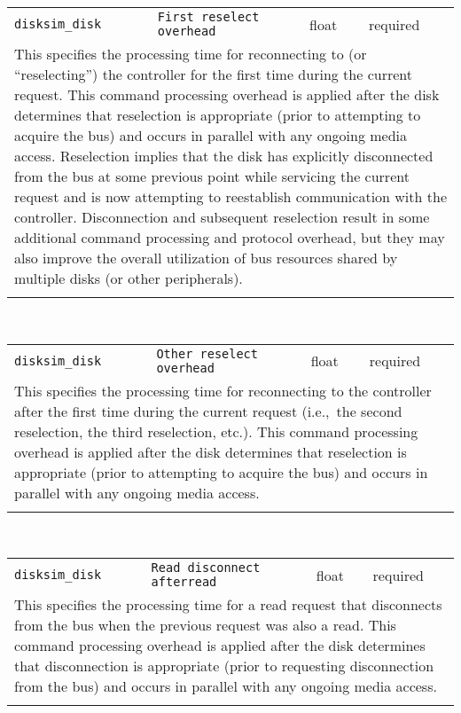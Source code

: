 \noindent 
\begin{tabular}{|p{\lpmodwidth}|p{\lpnamewidth}|p{0.5in}|p{0.5in}|}
\cline{1-4}
\texttt{disksim\_disk} & \texttt{First reselect overhead} & float & required \\ 
\cline{1-4}
\multicolumn{4}{|p{6in}|}{
This specifies the processing time for reconnecting to (or
``reselecting'') the controller for the first time during the current
request. This command processing overhead is applied after the disk
determines that reselection is appropriate (prior to attempting to
acquire the bus) and occurs in parallel with any ongoing media access.
Reselection implies that the disk has explicitly disconnected from the
bus at some previous point while servicing the current request and is
now attempting to reestablish communication with the controller.
Disconnection and subsequent reselection result in some additional
command processing and protocol overhead, but they may also improve
the overall utilization of bus resources shared by multiple disks (or
other peripherals).
}\\ 
\cline{1-4}
\multicolumn{4}{p{5in}}{}\\
\end{tabular}\\ 
\noindent 
\begin{tabular}{|p{\lpmodwidth}|p{\lpnamewidth}|p{0.5in}|p{0.5in}|}
\cline{1-4}
\texttt{disksim\_disk} & \texttt{Other reselect overhead} & float & required \\ 
\cline{1-4}
\multicolumn{4}{|p{6in}|}{
This specifies the processing time for reconnecting to the controller
after the first time during the current request (i.e.,~the second
reselection, the third reselection, etc.). This command processing
overhead is applied after the disk determines that reselection is
appropriate (prior to attempting to acquire the bus) and occurs in
parallel with any ongoing media access.
}\\ 
\cline{1-4}
\multicolumn{4}{p{5in}}{}\\
\end{tabular}\\ 
\noindent 
\begin{tabular}{|p{\lpmodwidth}|p{\lpnamewidth}|p{0.5in}|p{0.5in}|}
\cline{1-4}
\texttt{disksim\_disk} & \texttt{Read disconnect afterread} & float & required \\ 
\cline{1-4}
\multicolumn{4}{|p{6in}|}{
This specifies the processing time for a read request that disconnects
from the bus when the previous request was also a read. This command
processing overhead is applied after the disk determines that
disconnection is appropriate (prior to requesting disconnection from
the bus) and occurs in parallel with any ongoing media access.
}\\ 
\cline{1-4}
\multicolumn{4}{p{5in}}{}\\
\end{tabular}\\ 

